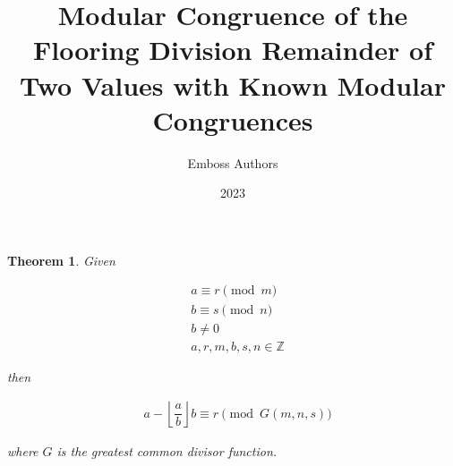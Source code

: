 \documentclass{article}
\title{Modular Congruence of the Flooring Division Remainder of Two Values with Known Modular Congruences}
\author{Emboss Authors}
\date{2023}
\begin{document}
\maketitle

\newtheorem{theorem}{Theorem}


\begin{theorem}
Given

\begin{align*}
  &{a} \equiv {r} \pmod{{m}} \\
  &{b} \equiv {s} \pmod{{n}} \\
  &{b} \neq 0 \\
  &{a}, {r}, {m}, {b}, {s}, {n} \in \mathbb{Z}
\end{align*}

then

\begin{align}
  &{a} - \left\lfloor\dfrac{{a}}{{b}}\right\rfloor{b} \equiv {r} \pmod{G\left({m}, {n}, {s}\right)} \label{eq:result}
\end{align}

where $G$ is the greatest common divisor function.
\end{theorem}
\end{document}
